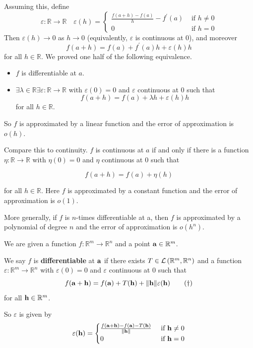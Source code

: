 \documentclass[a4paper]{article}
\begin{document}
Assuming this, define
$$
\varepsilon: \mathbb{R} \rightarrow \mathbb{R} \quad \varepsilon(h)= \begin{cases}\frac{f(a+h)-f(a)}{h}-f^{\prime}(a) & \text { if } h \neq 0 \\ 0 & \text { if } h=0\end{cases}
$$
Then $\varepsilon(h) \rightarrow 0$ as $h \rightarrow 0$ (equivalently, $\varepsilon$ is continuous at 0), and moreover
$$
f(a+h)=f(a)+f^{\prime}(a) h+\varepsilon(h) h
$$
for all $h \in \mathbb{R}$. We proved one half of the following equivalence.

\begin{itemize}
  \item $f$ is differentiable at $a$.

  \item $\exists \lambda \in \mathbb{R} \exists \varepsilon: \mathbb{R} \rightarrow \mathbb{R}$ with $\varepsilon(0)=0$ and $\varepsilon$ continuous at 0 such that
  $$
  f(a+h)=f(a)+\lambda h+\varepsilon(h) h
  $$
  for all $h \in \mathbb{R}$.
\end{itemize}


So $f$ is approximated by a linear function and the error of approximation is $o(h)$.

Compare this to continuity. $f$ is continuous at $a$ if and only if there is a function $\eta: \mathbb{R} \rightarrow \mathbb{R}$ with $\eta(0)=0$ and $\eta$ continuous at 0 such that

$$
f(a+h)=f(a)+\eta(h)
$$

for all $h \in \mathbb{R}$. Here $f$ is approximated by a constant function and the error of approximation is $o(1)$.

More generally, if $f$ is $n$-times differentiable at a, then $f$ is approximated by a polynomial of degree $n$ and the error of approximation is $o(h^{n})$.

\begin{definition}
    We are given a function $f: \mathbb{R}^{m} \rightarrow \mathbb{R}^{n}$ and a point ${\bf a} \in \mathbb{R}^{m}$.

    We say $f$ is \textbf{differentiable} at ${\bf a}$ if there exists $T \in {\mathcal{L}}\left(\mathbb{R}^{m}, \mathbb{R}^{n}\right)$ and a function $\varepsilon: \mathbb{R}^{m} \rightarrow \mathbb{R}^{n}$ with $\varepsilon(0)=0$ and $\varepsilon$ continuous at 0 such that
    \[
    f({\bf a}+{\bf h})=f({\bf a})+T({\bf h})+\|{\bf h}\| \varepsilon({\bf h})\tag{$\dagger$}
    \]
    for all ${\bf h} \in \mathbb{R}^{m}$.
\end{definition}
So $\varepsilon$ is given by
$$
\varepsilon({\bf h})= \begin{cases}\frac{f({\bf a}+{\bf h})-f({\bf a})-T({\bf h})}{\|{\bf h}\|} & \text { if } {\bf h} \neq 0 \\ 0 & \text { if } {\bf h}=0\end{cases}
$$
\end{document}
